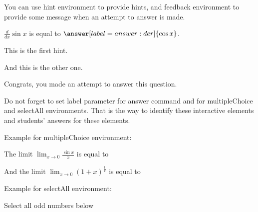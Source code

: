 \documentclass{ximera}
\begin{document}
You can use {\sf hint} environment to provide hints, and {\sf feedback} environment to provide some message when an attempt to answer is made.

\begin{problem}
$\frac{d}{dx} \sin x$ is equal to $\answer[label=answer:der]{\cos x}$.

\begin{hint}
This is the first hint.
\end{hint}

\begin{hint}
And this is the other one.
\end{hint}

\begin{feedback}
Congrats, you made an attempt to answer this question.
\end{feedback}

\end{problem}

Do not forget to set {\sf label} parameter for {\sf answer} command and for {\sf multipleChoice} and {\sf selectAll} environments.
That is the way to identify these interactive elements and students' answers for these elements. 

Example for {\sf multipleChoice} environment:

\begin{problem}
The limit $\lim_{x \to 0} \frac{\sin x}{x}$ is equal to

\begin{multipleChoice}[label=mlt:lim1]
\end{multipleChoice}

And the limit $\lim_{x \to 0} (1+x)^{\frac{1}{x}}$ is equal to
\begin{multipleChoice}[label=mlt:lim2]
\choice{$\pi$}
\end{multipleChoice}

\end{problem}


Example for {\sf selectAll} environment:

\begin{problem}
Select all odd numbers below

\begin{selectAll}[label=sall:oddnumbers]
\end{selectAll}

\end{problem}
\end{document}

